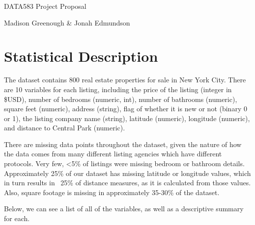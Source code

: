 \documentclass[11pt, a4paper]{article}
\begin{document}


\begin{center}
\LARGE{DATA583 Project Proposal}
\par
\vspace{1.0pc}
\par
\large{Madison Greenough \& Jonah Edmundson}
\end{center}


\vspace{0.917 pc} %



\section{Statistical Description}

The dataset contains 800 real estate properties for sale in New York City. There are 10 variables for each listing, including the price of the listing (integer in \$USD), number of bedrooms (numeric, int), number of bathrooms (numeric), square feet (numeric), address (string), flag of whether it is new or not (binary 0 or 1), the listing company name (string), latitude (numeric), longitude (numeric), and distance to Central Park (numeric).

There are missing data points throughout the dataset, given the nature of how the data comes from many different listing agencies which have different protocols. Very few, <5\% of listings were missing bedroom or bathroom details. Approximately 25\% of our dataset has missing latitude or longitude values, which in turn results in ~25\% of distance measures, as it is calculated from those values. Also, square footage is missing in approximately 35-30\% of the dataset. 

Below, we can see a list of all of the variables, as well as a descriptive summary for each. 
\end{document}
